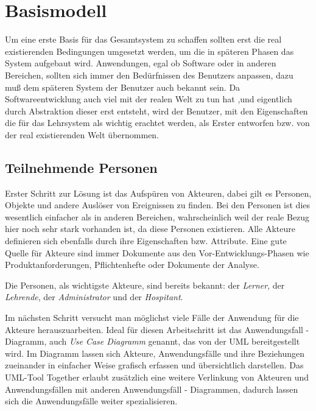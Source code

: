 \section{Basismodell}

Um eine erste Basis f\"ur das Gesamtsystem zu schaffen sollten erst die real
existierenden Bedingungen umgesetzt werden, um die in sp\"ateren Phasen das System
aufgebaut wird. Anwendungen, egal ob Software oder in anderen Bereichen, sollten
sich immer den Bed\"urfnissen des Benutzers anpassen, dazu mu{\ss} dem sp\"ateren
System der Benutzer auch bekannt sein. Da Softwareentwicklung auch viel mit der realen
Welt zu tun hat ,und eigentlich durch Abstraktion dieser erst entsteht, wird der
Benutzer, mit den Eigenschaften die f\"ur das Lehrsystem als wichtig erachtet werden,
als Erster entworfen bzw. von der real existierenden Welt \"ubernommen.

\subsection{Teilnehmende Personen}

Erster Schritt zur L\"osung ist das Aufsp\"uren von Akteuren, dabei gilt es Personen, 
Objekte und andere Ausl\"oser von Ereignissen zu finden. Bei den Personen ist dies
wesentlich einfacher als in anderen Bereichen, wahrscheinlich weil der reale Bezug
hier noch sehr stark vorhanden ist, da diese Personen existieren. Alle Akteure
definieren sich ebenfalls durch ihre Eigenschaften bzw. Attribute. Eine gute Quelle
f\"ur Akteure sind immer Dokumente aus den Vor-Entwicklungs-Phasen wie Produktanforderungen,
Pflichtenhefte oder Dokumente der Analyse.

Die Personen, als wichtigste Akteure, sind bereits bekannt: der {\sl Lerner}, der {\sl Lehrende},
der {\sl Administrator} und der {\sl Hospitant}. 

Im n\"achsten Schritt versucht man m\"oglichst viele F\"alle der Anwendung f\"ur die
Akteure herauszuarbeiten. Ideal f\"ur diesen Arbeitschritt ist das Anwendungsfall - Diagramm,
auch {\it Use Case Diagramm} genannt, das von der UML bereitgestellt wird. Im Diagramm
lassen sich Akteure, Anwendungsf\"alle und ihre Beziehungen zueinander in einfacher Weise 
grafisch erfassen und \"ubersichtlich darstellen.
Das UML-Tool Together erlaubt zus\"atzlich eine weitere Verlinkung von Akteuren und Anwendungsf\"allen
mit anderen Anwendungsf\"all - Diagrammen, dadurch lassen sich die Anwendungsf\"alle weiter
spezialisieren. 

